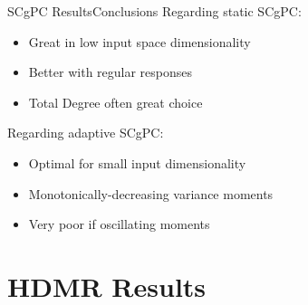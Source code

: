 \documentclass{beamer}
\begin{document}
\begin{frame}{SCgPC Results}{Conclusions}\vspace{-20pt}
  \vfill
Regarding static SCgPC:
\begin{itemize}
  \item Great in low input space dimensionality
  \item Better with regular responses
  \item Total Degree often great choice
\end{itemize}
  \vfill
Regarding adaptive SCgPC:
\begin{itemize}
  \item Optimal for small input dimensionality
  \item Monotonically-decreasing variance moments
  \item Very poor if oscillating moments
\end{itemize}
  \vfill
\end{frame}

\section{HDMR Results}
\end{document}
